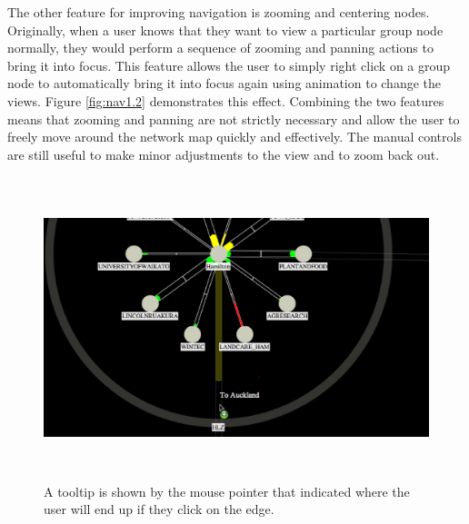 \documentclass[11pt, a4paper]{article}
\begin{document}
The other feature for improving navigation is zooming and centering nodes.
Originally, when a user knows that they want to view a particular group node
normally, they would perform a sequence of zooming and panning actions to bring
it into focus. This feature allows the user to simply right click on a group
node to automatically bring it into focus again using animation to change the
views. Figure \ref{fig:nav1.2} demonstrates this effect. Combining the two
features means that zooming and panning are not strictly necessary and allow the
user to freely move around the network map quickly and effectively. The manual
controls are still useful to make minor adjustments to the view and to zoom back
out.

\begin{figure}[h]
\centering
\includegraphics[width=170mm,height=88.01mm]{assets/nav1-1.eps}
\caption{A tooltip is shown by the mouse pointer that indicated where the user
will end up if they click on the edge.}
\label{fig:nav1.1}
\end{figure}
\end{document}
